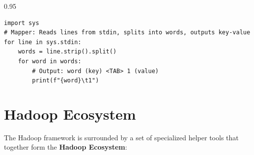 \documentclass[12pt,a4paper]{article}
\begin{document}
\begin{tcolorbox}[examplebox, title={Example: Python Mapper Script for Streaming}]
\begin{spacing}{0.95}
\begin{verbatim}
import sys
# Mapper: Reads lines from stdin, splits into words, outputs key-value
for line in sys.stdin:
    words = line.strip().split()
    for word in words:
        # Output: word (key) <TAB> 1 (value)
        print(f"{word}\t1")
\end{verbatim}
\end{spacing}
\end{tcolorbox}

\section{Hadoop Ecosystem}

The Hadoop framework is surrounded by a set of specialized helper tools that together form the \textbf{Hadoop Ecosystem}:
\end{document}
